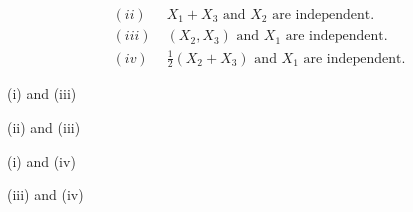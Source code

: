 \documentclass[journal]{IEEEtran}
\begin{document}
\begin{enumerate}
\begin{align*}
(ii) & \; X_1 + X_3 \text{ and } X_2 \text{ are independent.} \\ 
(iii) & \; (X_2, X_3) \text{ and } X_1 \text{ are independent.} \\ 
(iv) & \; \frac{1}{2}(X_2 + X_3) \text{ and } X_1 \text{ are independent.} 
\end{align*}
\begin{enumerate}
\begin{multicols}{4}
\item (i) and (iii)
\item (ii) and (iii)
\item (i) and (iv)
\item (iii) and (iv)
\end{multicols}
\end{enumerate}
\end{enumerate}
\end{document}
